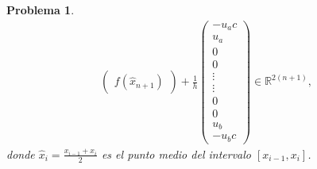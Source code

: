 \documentclass[10pt,a4paper]{report}
\newtheorem{pro}{Problema}
\begin{document}
\begin{pro}
\begin{align*}
\begin{pmatrix}
		f(\hat{x}_{n+1})
	\end{pmatrix} + \frac{1}{h}\begin{pmatrix}
		-u_{a}c\\ 
		u_{a}\\ 
		0\\ 
		0\\ 
		\vdots\\ 
		\vdots\\ 
		0\\ 
		0\\ 
		u_{b}\\ 
		-u_{b}c
	\end{pmatrix}\in \mathbb{R}^{2(n+1)},
	\end{align*}
    donde $\hat{x}_{i} = \frac{x_{i-1} + x_{i}}{2}$ es el punto medio del intervalo $[x_{i-1},x_{i}]$.
	\end{pro}
\end{document}
